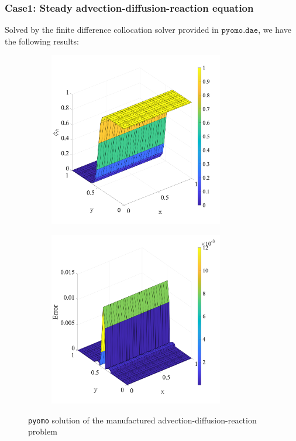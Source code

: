 \documentclass{article}
\begin{document}
\subsubsection{Case1: Steady advection-diffusion-reaction equation}
Solved by the finite difference collocation solver provided in $\texttt{pyomo.dae}$, we have the following results:
\begin{figure}[H]
\centering
   	 \begin{subfigure}[b]{0.49\textwidth}
   	 	\centering
		\includegraphics[height=3in]{fig/steady-adr-smooth.png}
		\caption{}
		\label{s-adr}
	\end{subfigure}
	\begin{subfigure}[b]{0.49\textwidth}
   	 	\centering
		\includegraphics[height=3in]{fig/steady-adr-smooth-error.png}
		\caption{}
		\label{se-adr}
	\end{subfigure}

	\caption{\texttt{pyomo} solution of the manufactured advection-diffusion-reaction problem}
	\label{f1}
\end{figure}
\end{document}
